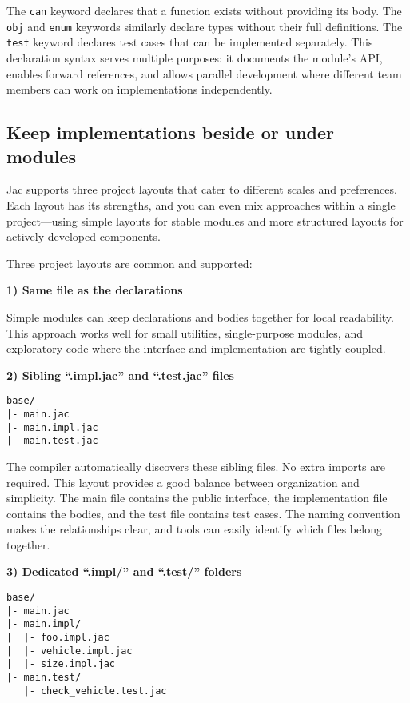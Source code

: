 The \texttt{can} keyword declares that a function exists without providing its body. The \texttt{obj} and \texttt{enum} keywords similarly declare types without their full definitions. The \texttt{test} keyword declares test cases that can be implemented separately. This declaration syntax serves multiple purposes: it documents the module's API, enables forward references, and allows parallel development where different team members can work on implementations independently.

\subsection*{Keep implementations beside or under modules}

Jac supports three project layouts that cater to different scales and preferences. Each layout has its strengths, and you can even mix approaches within a single project—using simple layouts for stable modules and more structured layouts for actively developed components.

Three project layouts are common and supported:

\textbf{1) Same file as the declarations}

Simple modules can keep declarations and bodies together for local readability. This approach works well for small utilities, single-purpose modules, and exploratory code where the interface and implementation are tightly coupled.

\textbf{2) Sibling ``.impl.jac'' and ``.test.jac'' files}

\begin{lstlisting}[language=shell]
base/
|- main.jac
|- main.impl.jac
|- main.test.jac
\end{lstlisting}

The compiler automatically discovers these sibling files. No extra imports are required. This layout provides a good balance between organization and simplicity. The main file contains the public interface, the implementation file contains the bodies, and the test file contains test cases. The naming convention makes the relationships clear, and tools can easily identify which files belong together.

\textbf{3) Dedicated ``.impl/'' and ``.test/'' folders}

\begin{lstlisting}[language=shell]
base/
|- main.jac
|- main.impl/
|  |- foo.impl.jac
|  |- vehicle.impl.jac
|  |- size.impl.jac
|- main.test/
   |- check_vehicle.test.jac
\end{lstlisting}

